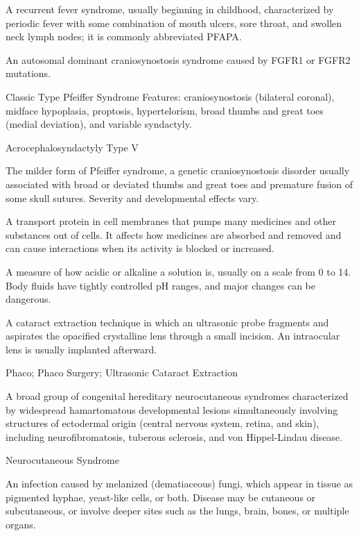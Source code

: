  A recurrent fever syndrome, usually beginning in childhood, characterized by periodic fever with some combination of mouth ulcers, sore throat, and swollen neck lymph nodes; it is commonly abbreviated PFAPA.

 An autosomal dominant craniosynostosis syndrome caused by FGFR1 or FGFR2 mutations.

\synonyms
Classic Type Pfeiffer Syndrome
Features: craniosynostosis (bilateral coronal), midface hypoplasia, proptosis,
hypertelorism, broad thumbs and great toes (medial deviation), and variable syndactyly.

\synonyms
Acrocephalosyndactyly Type V

 The milder form of Pfeiffer syndrome, a genetic craniosynostosis disorder usually associated with broad or deviated thumbs and great toes and premature fusion of some skull sutures. Severity and developmental effects vary.

 A transport protein in cell membranes that pumps many medicines and other substances out of cells. It affects how medicines are absorbed and removed and can cause interactions when its activity is blocked or increased.

 A measure of how acidic or alkaline a solution is, usually on a scale from 0 to 14. Body fluids have tightly controlled pH ranges, and major changes can be dangerous.

 A cataract extraction technique in which an ultrasonic probe fragments and aspirates the opacified crystalline lens through a small incision. An intraocular lens is usually implanted afterward.

\synonyms
Phaco; Phaco Surgery; Ultrasonic Cataract Extraction

 A broad group of congenital hereditary neurocutaneous syndromes characterized by widespread hamartomatous developmental lesions simultaneously involving structures of ectodermal origin (central nervous system, retina, and skin), including neurofibromatosis, tuberous sclerosis, and von Hippel-Lindau disease.

\synonyms
Neurocutaneous Syndrome

 An infection caused by melanized (dematiaceous) fungi, which appear in tissue as pigmented hyphae, yeast-like cells, or both. Disease may be cutaneous or subcutaneous, or involve deeper sites such as the lungs, brain, bones, or multiple organs.

